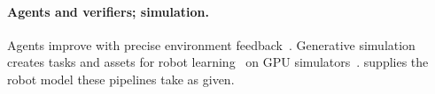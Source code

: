 \paragraph{Agents and verifiers; simulation.}
Agents improve with precise environment feedback~\citep{jimenez2024swebench,shinn2023reflexion,madaan2023selfrefine,romeraparedes2024funsearch,ma2024eureka}.
Generative simulation creates tasks and assets for robot learning~\citep{wang2024robogen,wang2024gensim}
on GPU simulators~\citep{freeman2021brax,makoviychuk2021isaac,rudin2021legged}. \ms supplies the
robot model these pipelines take as given.
